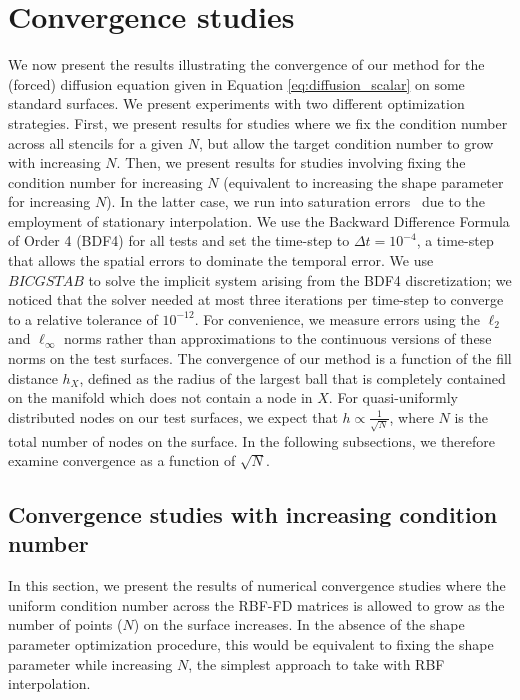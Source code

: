 \documentclass[smallextended]{svjour3}
\newcommand{\bicgstab}{{BICGSTAB}}
\begin{document}
\section{Convergence studies}
\label{sec:convergence}
We now present the results illustrating the convergence of our method for the (forced) diffusion equation given in Equation \eqref{eq:diffusion_scalar} on some standard surfaces. We present experiments with two different optimization strategies. First, we present results for studies where we fix the condition number across all stencils for a given $N$, but allow the target condition number to grow with increasing $N$. Then, we present results for studies involving fixing the condition number for increasing $N$ (equivalent to increasing the shape parameter for increasing $N$). In the latter case, we run into saturation errors~\cite{Fasshauer:2007} due to the employment of stationary interpolation.  We use the Backward Difference Formula of Order 4 (BDF4) for all tests and set the time-step to $\Delta t = 10^{-4}$, a time-step that allows the spatial errors to dominate the temporal error. We use $\bicgstab$ to solve the implicit system arising from the BDF4 discretization; we noticed that the solver needed at most three iterations per time-step to converge to a relative tolerance of $10^{-12}$. For convenience, we measure errors using the $\ell_2$ and $\ell_{\infty}$ norms rather than approximations to the continuous versions of these norms on the test surfaces. The convergence of our method is a function of the fill distance $h_X$, defined as the radius of the largest ball that is completely contained on the manifold which does not contain a node in $X$. For quasi-uniformly distributed nodes on our test surfaces, we expect that $h \propto \frac{1}{\sqrt{N}}$, where $N$ is the total number of nodes on the surface. In the following subsections, we therefore examine convergence as a function of $\sqrt{N}$.

\subsection{Convergence studies with increasing condition number}
\label{sec:results1a}

In this section, we present the results of numerical convergence studies where the uniform condition number across the RBF-FD matrices is allowed to grow as the number of points ($N$) on the surface increases. In the absence of the shape parameter optimization procedure, this would be equivalent to fixing the shape parameter while increasing $N$, the simplest approach to take with RBF interpolation.
\end{document}
